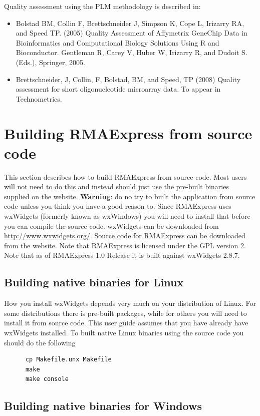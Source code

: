\documentclass[11pt]{report}
\begin{document}
Quality assessment using the PLM methodology is described in:
\begin{itemize}
\item Bolstad BM, Collin F, Brettschneider J, Simpson K, Cope L, Irizarry RA, and Speed TP. (2005) Quality Assessment of Affymetrix GeneChip Data in Bioinformatics and Computational Biology Solutions Using R and Bioconductor. Gentleman R, Carey V, Huber W, Irizarry R, and  Dudoit S. (Eds.), Springer, 2005.
\item Brettschneider, J, Collin, F, Bolstad, BM, and Speed, TP (2008) Quality assessment for short oligonucleotide microarray data. To appear in Technometrics.
\end{itemize}


\chapter{Building RMAExpress from source code} \label{chap:building}

This section describes how to build RMAExpress from source code. Most users will not need to do this and instead should just use the pre-built binaries supplied on the website. {\bf Warning}: do no try to built the application from source code unless you think you have a good reason to. Since RMAExpress uses wxWidgets (formerly known as wxWindows) you will need to install that before you can compile the source code. wxWidgets can be downloaded from \url{http://www.wxwidgets.org/}. Source code for RMAExpress can be downloaded from the website. Note that RMAExpress is licensed under the GPL version 2. Note that as of RMAExpress 1.0 Release it is built against wxWidgets 2.8.7.

\section{Building native binaries for Linux}

How you install wxWidgets depends very much on your distribution of Linux. For some distributions there is pre-built packages, while for others you will need to install it from source code. This user guide assumes that you have already have wxWidgets installed. To built native Linux binaries using the source code you should do the following
\begin{verbatim}
      cp Makefile.unx Makefile
      make
      make console
\end{verbatim}

\section{Building native binaries for Windows}
\end{document}

